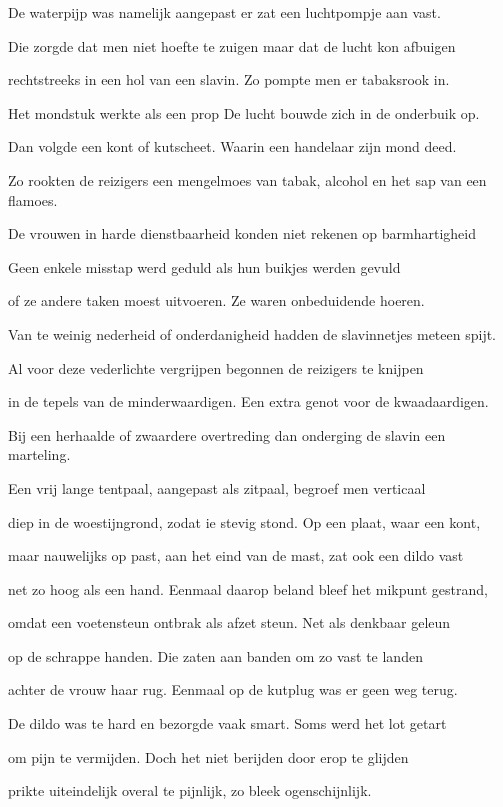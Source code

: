 De waterpijp was namelijk aangepast
er zat een luchtpompje aan vast.

Die zorgde dat men niet hoefte te zuigen
maar dat de lucht kon afbuigen

rechtstreeks in een hol van een slavin.
Zo pompte men er tabaksrook in.

Het mondstuk werkte als een prop
De lucht bouwde zich in de onderbuik op.

Dan volgde een kont of kutscheet.
Waarin een handelaar zijn mond deed.

Zo rookten de reizigers een mengelmoes
van tabak, alcohol en het sap van een flamoes.

De vrouwen in harde dienstbaarheid
konden niet rekenen op barmhartigheid

Geen enkele misstap werd geduld
als hun buikjes werden gevuld

of ze andere taken moest uitvoeren.
Ze waren onbeduidende hoeren.

Van te weinig nederheid of onderdanigheid
hadden de slavinnetjes meteen spijt.

Al voor deze vederlichte vergrijpen
begonnen de reizigers te knijpen

in de tepels van de minderwaardigen.
Een extra genot voor de kwaadaardigen.

Bij een herhaalde of zwaardere overtreding
dan onderging de slavin een marteling.

Een vrij lange tentpaal,
aangepast als zitpaal,
begroef men verticaal

diep in de woestijngrond,
zodat ie stevig stond.
Op een plaat, waar een kont,

maar nauwelijks op past,
aan het eind van de mast,
zat ook een dildo vast

net zo hoog als een hand.
Eenmaal daarop beland
bleef het mikpunt gestrand,

omdat een voetensteun
ontbrak als afzet steun.
Net als denkbaar geleun

op de schrappe handen.
Die zaten aan banden
om zo vast te landen

achter de vrouw haar rug.
Eenmaal op de kutplug
was er geen weg terug.

De dildo was te hard
en bezorgde vaak smart.
Soms werd het lot getart

om pijn te vermijden.
Doch het niet berijden
door erop te glijden

prikte uiteindelijk
overal te pijnlijk,
zo bleek ogenschijnlijk.

